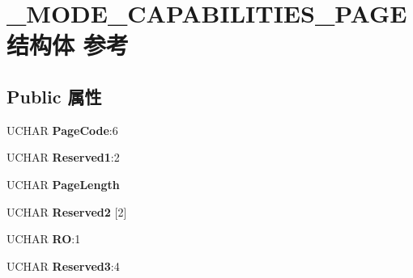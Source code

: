 \hypertarget{struct___m_o_d_e___c_a_p_a_b_i_l_i_t_i_e_s___p_a_g_e}{}\section{\+\_\+\+M\+O\+D\+E\+\_\+\+C\+A\+P\+A\+B\+I\+L\+I\+T\+I\+E\+S\+\_\+\+P\+A\+G\+E结构体 参考}
\label{struct___m_o_d_e___c_a_p_a_b_i_l_i_t_i_e_s___p_a_g_e}
\subsection*{Public 属性}
\begin{DoxyCompactItemize}
\item 
\mbox{\label{struct___m_o_d_e___c_a_p_a_b_i_l_i_t_i_e_s___p_a_g_e_a95de67b119ccc4aa04915c92b8514966}} 
U\+C\+H\+AR {\bfseries Page\+Code}\+:6
\item 
\mbox{\label{struct___m_o_d_e___c_a_p_a_b_i_l_i_t_i_e_s___p_a_g_e_a6b85b1f02483adcccabd24c89731aeef}} 
U\+C\+H\+AR {\bfseries Reserved1}\+:2
\item 
\mbox{\label{struct___m_o_d_e___c_a_p_a_b_i_l_i_t_i_e_s___p_a_g_e_a508cb32a7ec2ec4aa7e801769bb56858}} 
U\+C\+H\+AR {\bfseries Page\+Length}
\item 
\mbox{\label{struct___m_o_d_e___c_a_p_a_b_i_l_i_t_i_e_s___p_a_g_e_aea4ad9b763a5b3c932c5748d47266758}} 
U\+C\+H\+AR {\bfseries Reserved2} \mbox{[}2\mbox{]}
\item 
\mbox{\label{struct___m_o_d_e___c_a_p_a_b_i_l_i_t_i_e_s___p_a_g_e_a68e3e52c73ab08c916a6bd432b3e5589}} 
U\+C\+H\+AR {\bfseries RO}\+:1
\item 
\mbox{\label{struct___m_o_d_e___c_a_p_a_b_i_l_i_t_i_e_s___p_a_g_e_a3fcff056367709c0b0fe37bdf29fef35}} 
U\+C\+H\+AR {\bfseries Reserved3}\+:4
\item 
\mbox{\label{struct___m_o_d_e___c_a_p_a_b_i_l_i_t_i_e_s___p_a_g_e_ae96924e63e4f64a48a4ad9d2ec634126}} 

\end{DoxyCompactItemize}
